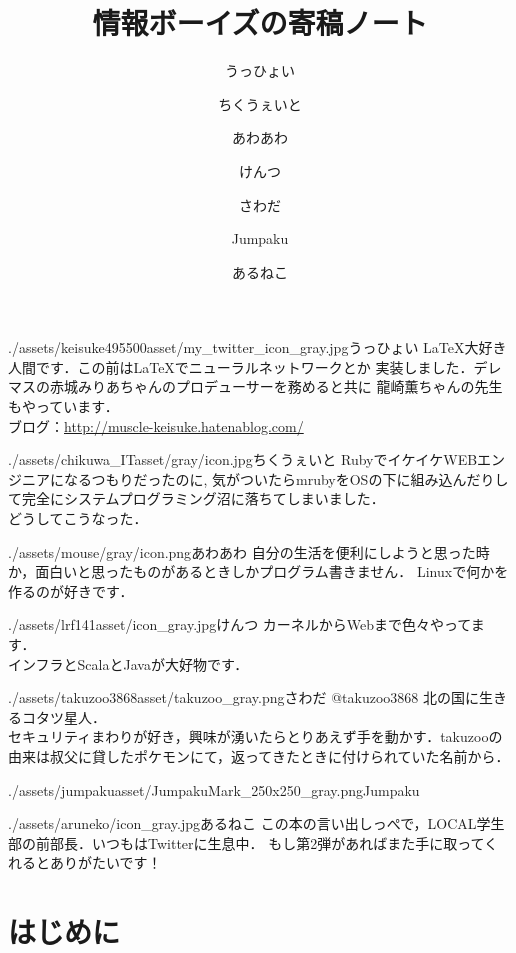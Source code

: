 \documentclass[autodetect-engine,dvipdfmx-if-dvi,ja=standard,b5paper,10.5pt,twoside,openany,layout=v2]{bxjsbook}
\title{情報ボーイズの寄稿ノート}
\author{うっひょい \and ちくうぇいと \and あわあわ \and けんつ \and さわだ \and Jumpaku \and あるねこ}
\date{}
\newcommand{\articlepath}{./articles}
\newcommand{\assetspath}{./assets}
\newcommand{\jumpakuasset}{\assetspath/jumpakuasset}
\newcommand{\takuzooasset}{\assetspath/takuzoo3868asset}
\newcommand{\lrfasset}{\assetspath/lrf141asset}
\newcommand{\materialofmouseasset}{\assetspath/mouse/gray}
\newcommand{\keisukeasset}{\assetspath/keisuke495500asset}
\newcommand{\chikuwaitasset}{\assetspath/chikuwa_ITasset/gray}
\begin{document}
\frontmatter
\maketitle
\begin{myintroduce}{\keisukeasset/my_twitter_icon_gray.jpg}{うっひょい}
  \LaTeX 大好き人間です．この前は\LaTeX でニューラルネットワークとか
  実装しました．デレマスの赤城みりあちゃんのプロデューサーを務めると共に
  龍崎薫ちゃんの先生もやっています．\\
  ブログ：\url{http://muscle-keisuke.hatenablog.com/}
\end{myintroduce}
\begin{myintroduce}{\chikuwaitasset/icon.jpg}{ちくうぇいと}
  RubyでイケイケWEBエンジニアになるつもりだったのに, 気がついたらmrubyをOSの下に組み込んだりして完全にシステムプログラミング沼に落ちてしまいました．\\
  どうしてこうなった．
\end{myintroduce}
\begin{myintroduce}{\materialofmouseasset/icon.png}{あわあわ}
  自分の生活を便利にしようと思った時か，面白いと思ったものがあるときしかプログラム書きません．
  Linuxで何かを作るのが好きです．
\end{myintroduce}
\begin{myintroduce}{\lrfasset/icon_gray.jpg}{けんつ}
  カーネルからWebまで色々やってます．\\
  インフラとScalaとJavaが大好物です．
\end{myintroduce}
\begin{myintroduce}{\takuzooasset/takuzoo_gray.png}{さわだ @takuzoo3868}
  北の国に生きるコタツ星人．\\
  セキュリティまわりが好き，興味が湧いたらとりあえず手を動かす．takuzooの由来は叔父に貸したポケモンにて，返ってきたときに付けられていた名前から．
\end{myintroduce}
\begin{myintroduce}{\jumpakuasset/JumpakuMark_250x250_gray.png}{Jumpaku}

\end{myintroduce}

\begin{myintroduce}{./assets/aruneko/icon_gray.jpg}{あるねこ}
  この本の言い出しっぺで，LOCAL学生部の前部長．いつもはTwitterに生息中．
  もし第2弾があればまた手に取ってくれるとありがたいです！
\end{myintroduce}

\chapter{はじめに}

\end{document}
